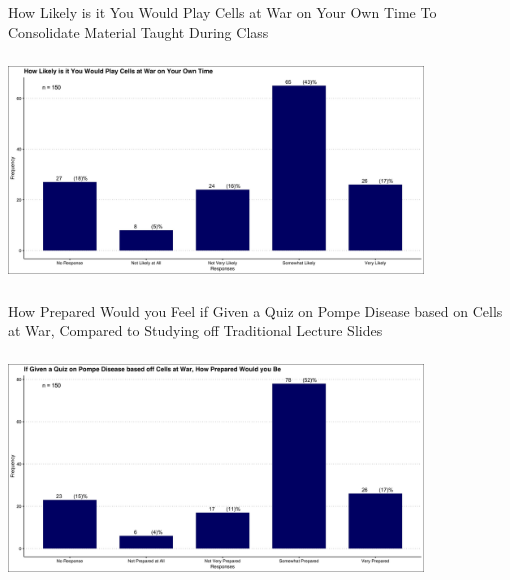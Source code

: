 \documentclass{beamer}
\begin{document}
	\begin{frame}{How Likely is it You Would Play Cells at War on Your Own Time To Consolidate Material Taught During Class}
		\begin{center}
			\includegraphics[width=11cm, height=6cm]{how_likely_you_would_play_cellsatwar.jpg}
		\end{center}
	\end{frame}

	\begin{frame}{How Prepared Would you Feel if Given a Quiz on Pompe Disease based on Cells at War, Compared to Studying off Traditional Lecture Slides}
		\begin{center}
			\includegraphics[width=11cm, height=6cm]{how_prepared_if_tested_on_pompe_based_off_cellsatwar.jpg}
		\end{center}
	\end{frame}
\end{document}

